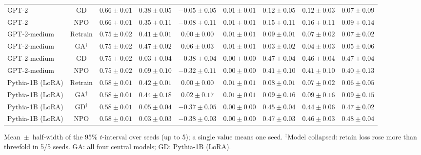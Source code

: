 {\begin{longtable}{@{\extracolsep{\fill}}lcccccccc@{}}
GPT-2 & GD & $0.66 \pm 0.01$ & $0.38 \pm 0.05$ & $-0.05 \pm 0.05$ & $0.01 \pm 0.01$ & $0.12 \pm 0.05$ & $0.12 \pm 0.03$ & $0.07 \pm 0.09$ \\
GPT-2 & NPO & $0.66 \pm 0.01$ & $0.35 \pm 0.11$ & $-0.08 \pm 0.11$ & $0.01 \pm 0.01$ & $0.15 \pm 0.11$ & $0.16 \pm 0.11$ & $0.09 \pm 0.14$ \\
GPT-2-medium & Retrain & $0.75 \pm 0.02$ & $0.41 \pm 0.01$ & $0.00 \pm 0.00$ & $0.01 \pm 0.01$ & $0.09 \pm 0.01$ & $0.07 \pm 0.02$ & $0.07 \pm 0.02$ \\
GPT-2-medium & GA$^{\dagger}$ & $0.75 \pm 0.02$ & $0.47 \pm 0.02$ & $0.06 \pm 0.03$ & $0.01 \pm 0.01$ & $0.03 \pm 0.02$ & $0.04 \pm 0.03$ & $0.05 \pm 0.06$ \\
GPT-2-medium & GD & $0.75 \pm 0.02$ & $0.03 \pm 0.04$ & $-0.38 \pm 0.04$ & $0.00 \pm 0.00$ & $0.47 \pm 0.04$ & $0.46 \pm 0.04$ & $0.47 \pm 0.04$ \\
GPT-2-medium & NPO & $0.75 \pm 0.02$ & $0.09 \pm 0.10$ & $-0.32 \pm 0.11$ & $0.00 \pm 0.00$ & $0.41 \pm 0.10$ & $0.41 \pm 0.10$ & $0.40 \pm 0.13$ \\
Pythia-1B (LoRA) & Retrain & $0.58 \pm 0.01$ & $0.42 \pm 0.01$ & $0.00 \pm 0.00$ & $0.01 \pm 0.01$ & $0.08 \pm 0.01$ & $0.07 \pm 0.02$ & $0.06 \pm 0.05$ \\
Pythia-1B (LoRA) & GA$^{\dagger}$ & $0.58 \pm 0.01$ & $0.44 \pm 0.18$ & $0.02 \pm 0.17$ & $0.01 \pm 0.01$ & $0.09 \pm 0.16$ & $0.09 \pm 0.16$ & $0.09 \pm 0.15$ \\
Pythia-1B (LoRA) & GD$^{\dagger}$ & $0.58 \pm 0.01$ & $0.05 \pm 0.04$ & $-0.37 \pm 0.05$ & $0.00 \pm 0.00$ & $0.45 \pm 0.04$ & $0.44 \pm 0.06$ & $0.47 \pm 0.02$ \\
Pythia-1B (LoRA) & NPO & $0.58 \pm 0.01$ & $0.03 \pm 0.03$ & $-0.38 \pm 0.03$ & $0.00 \pm 0.00$ & $0.47 \pm 0.03$ & $0.46 \pm 0.03$ & $0.48 \pm 0.04$ \\
\end{longtable}
Mean~$\pm$~half-width of the 95\% $t$-interval over seeds (up to 5); a single value means one seed. $^{\dagger}$Model collapsed: retain loss rose more than threefold in 5/5 seeds. GA: all four central models; GD: Pythia-1B (LoRA).\par
}
